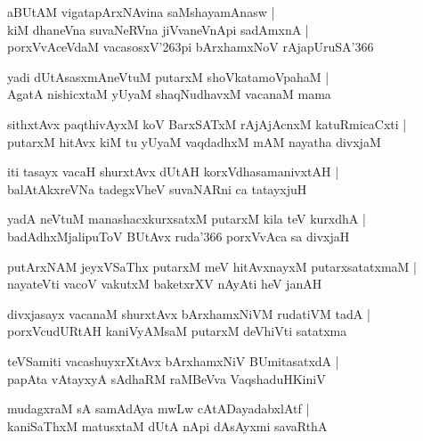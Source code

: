 \begin{shloka}
aBUtAM vigatapArxNAvina saMshayamAnasw |\\
kiM dhaneVna suvaNeRVna jiVvaneVnApi sadAmxnA |\\
porxVvAceVdaM vacasosxV\char'263pi bArxhamxNoV rAjapUruSA\char'366
\end{shloka}

\begin{shloka}
yadi dUtAsasxmAneVtuM putarxM shoVkatamoVpahaM |\\
AgatA nishicxtaM yUyaM shaqNudhavxM vacanaM mama
\end{shloka}

\begin{shloka}
sithxtAvx paqthivAyxM koV BarxSATxM rAjAjAcnxM katuRmicaCxti |\\
putarxM hitAvx kiM tu yUyaM vaqdadhxM mAM nayatha divxjaM 
\end{shloka}

\begin{shloka}
iti tasayx vacaH shurxtAvx dUtAH korxVdhasamanivxtAH |\\
balAtAkxreVNa tadegxVheV suvaNARni ca tatayxjuH
\end{shloka}

\begin{shloka}
yadA neVtuM manashacxkurxsatxM putarxM kila teV kurxdhA |\\
badAdhxMjalipuToV BUtAvx ruda\char'366 porxVvAca sa divxjaH 
\end{shloka}

\begin{shloka}
putArxNAM jeyxVSaThx putarxM meV hitAvxnayxM putarxsatatxmaM |\\
nayateVti vacoV vakutxM baketxrXV nAyAti heV janAH
\end{shloka}

\begin{shloka}
divxjasayx vacanaM shurxtAvx bArxhamxNiVM rudatiVM tadA |\\
porxVcudURtAH kaniVyAMsaM putarxM deVhiVti satatxma
\end{shloka}

\begin{shloka}
teVSamiti vacashuyxrXtAvx bArxhamxNiV BUmitasatxdA |\\
papAta vAtayxyA sAdhaRM raMBeVva VaqshaduHKiniV
\end{shloka}

\begin{shloka}
mudagxraM sA samAdAya mwLw cAtADayadabxlAtf |\\
kaniSaThxM matusxtaM dUtA nApi dAsAyxmi savaRthA
\end{shloka}

